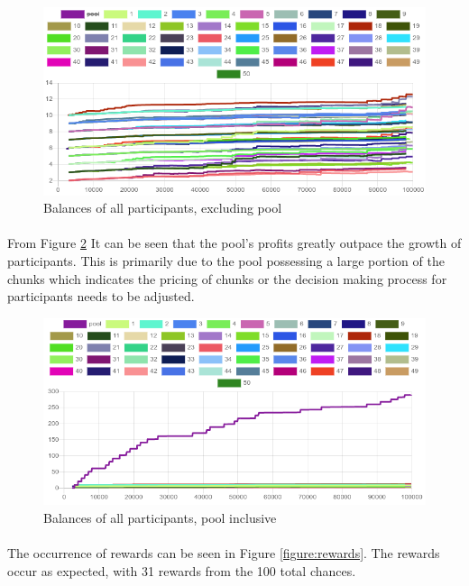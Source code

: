 \begin{figure}[H]
  \centering
  \caption{Balances of all participants, excluding pool}
  \label{figure:balances}
  \includegraphics[width=\linewidth]{media/fig-balances}
\end{figure}

\paragraph{} From Figure \ref{figure:balances-pool} It can be seen that the pool's profits greatly outpace the growth of participants. This is primarily due to the pool possessing a large portion of the chunks which indicates the pricing of chunks or the decision making process for participants needs to be adjusted.

\begin{figure}[H]
  \centering
  \caption{Balances of all participants, pool inclusive}
  \label{figure:balances-pool}
  \includegraphics[width=\linewidth]{media/fig-balances-pool}
\end{figure}

\paragraph{} The occurrence of rewards can be seen in Figure \ref{figure:rewards}. The rewards occur as expected, with 31 rewards from the 100 total chances.

